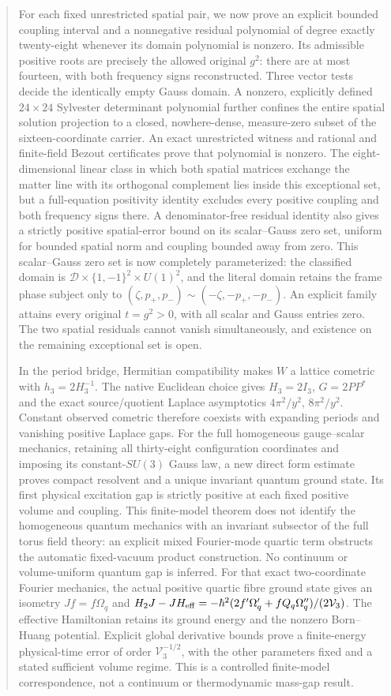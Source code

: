 \documentclass[11pt,letterpaper]{article}
\theoremstyle{definition}
\theoremstyle{remark}
\begin{document}
\begin{abstract}
For each fixed unrestricted spatial pair, we now prove an explicit
bounded coupling interval and a nonnegative residual polynomial of
degree exactly twenty-eight whenever its domain polynomial is nonzero.
Its admissible positive roots are precisely the allowed original $g^2$:
there are at most fourteen, with both frequency signs reconstructed.
Three vector tests decide the identically empty Gauss domain.
A nonzero, explicitly defined $24\times24$ Sylvester determinant
polynomial further confines the entire spatial solution projection to
a closed, nowhere-dense, measure-zero subset of the sixteen-coordinate
carrier. An exact unrestricted witness and rational and finite-field
Bezout certificates prove that polynomial is nonzero. The eight-dimensional linear class in which both spatial matrices
exchange the matter line with its orthogonal complement lies inside this
exceptional set, but a full-equation positivity identity excludes every
positive coupling and both frequency signs there. A denominator-free
residual identity also gives a strictly positive spatial-error bound on
its scalar--Gauss zero set, uniform for bounded spatial norm and coupling
bounded away from zero. This scalar--Gauss zero set is now completely
parameterized: the classified domain is
$\mathcal D\times\{1,-1\}^2\times U(1)^2$, and the literal domain
retains the frame phase subject only to
$(\zeta,p_+,p_-)\sim(-\zeta,-p_+,-p_-)$.
An explicit family attains every original $t=g^2>0$, with all scalar
and Gauss entries zero. The two spatial residuals cannot vanish simultaneously, and
existence on the remaining exceptional set is open.

In the period bridge, Hermitian compatibility makes
$W$ a lattice cometric with $h_3=2H_3^{-1}$.
The native Euclidean choice gives $H_3=2I_3$, $G=2PP^*$ and the exact
source/quotient Laplace asymptotics $4\pi^2/y^2$, $8\pi^2/y^2$.
Constant observed cometric therefore coexists with expanding periods and
vanishing positive Laplace gaps.
For the full homogeneous gauge--scalar mechanics, retaining all
thirty-eight configuration coordinates and imposing its constant-$SU(3)$
Gauss law, a new direct form estimate proves compact resolvent and a
unique invariant quantum ground state. Its first physical excitation
gap is strictly positive at each fixed positive volume and coupling.
This finite-model theorem does not identify the homogeneous quantum
mechanics with an invariant subsector of the full torus field theory:
an explicit mixed Fourier-mode quartic term obstructs the automatic
fixed-vacuum product construction. No continuum or volume-uniform
quantum gap is inferred.
For that exact two-coordinate Fourier mechanics, the actual positive
quartic fibre ground state gives an isometry $Jf=f\Omega_q$ and
$H_2J-JH_{\rm eff}=-\hbar^2(2f'\Omega'_q+fQ_q\Omega''_q)/(2\mathcal V_3)$.
The effective Hamiltonian retains its ground energy and the nonzero
Born--Huang potential. Explicit global derivative bounds prove a
finite-energy physical-time error of order $\mathcal V_3^{-1/2}$,
with the other parameters fixed and a stated sufficient volume regime.
This is a controlled finite-model correspondence, not a continuum
or thermodynamic mass-gap result.
\end{abstract}
\end{document}
